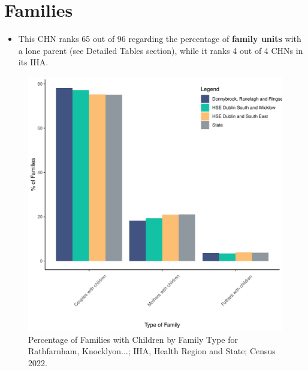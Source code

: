 \documentclass{article}
\begin{document}
\section{Families}\label{sect:Fam}
\begin{itemize}
\item This CHN ranks  65 out of 96 regarding the percentage of \textbf{family units} with a lone parent (see Detailed Tables section), while it ranks   4 out of 4 CHNs in its IHA.
\end{itemize}
\begin{figure}[H]
	\centering
	\includegraphics[width = 150mm]{../figures/FamED.pdf}
	\caption{Percentage of Families with Children by Family Type for Rathfarnham, Knocklyon...; IHA, Health Region and State; Census 2022.}
	\label{fig:vbnv}
	\end{figure}
	
\end{document}
